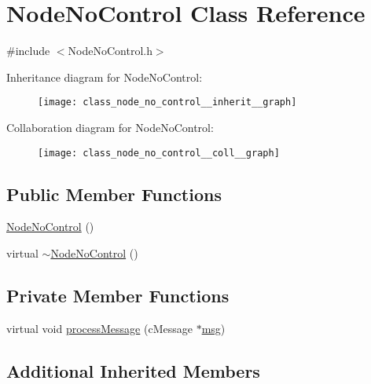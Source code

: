 \hypertarget{class_node_no_control}{}\section{Node\+No\+Control Class Reference}
\label{class_node_no_control}


{\ttfamily \#include $<$Node\+No\+Control.\+h$>$}



Inheritance diagram for Node\+No\+Control\+:\nopagebreak
\begin{figure}[H]
\begin{center}
\leavevmode
\texttt{[image: class\_node\_no\_control\_\_inherit\_\_graph]}
\end{center}
\end{figure}


Collaboration diagram for Node\+No\+Control\+:\nopagebreak
\begin{figure}[H]
\begin{center}
\leavevmode
\texttt{[image: class\_node\_no\_control\_\_coll\_\_graph]}
\end{center}
\end{figure}
\subsection*{Public Member Functions}
\begin{DoxyCompactItemize}
\item 
\hyperlink{class_node_no_control_ae48bd313edf922a104d690959f232822}{Node\+No\+Control} ()
\item 
virtual \hyperlink{class_node_no_control_a186d700d000404aa55658dd732e6ef4b}{$\sim$\+Node\+No\+Control} ()
\end{DoxyCompactItemize}
\subsection*{Private Member Functions}
\begin{DoxyCompactItemize}
\item 
virtual void \hyperlink{class_node_no_control_aa83bc408fe3dab03f124ea5489946836}{process\+Message} (c\+Message $\ast$\hyperlink{_controller_8h_afa0f3b802fbc219228f7bb97996fa558}{msg})
\end{DoxyCompactItemize}
\subsection*{Additional Inherited Members}


